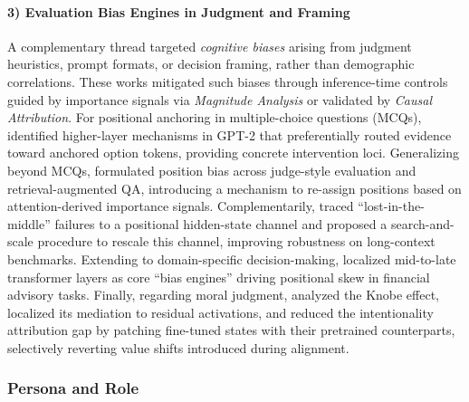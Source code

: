 \documentclass[11pt,letterpaper]{mystyle}
\begin{document}
  \paragraph{3) Evaluation Bias Engines in Judgment and Framing}
  A complementary thread targeted \emph{cognitive biases} arising from judgment heuristics, prompt formats, or decision framing, rather than demographic correlations. These works mitigated such biases through inference-time controls guided by importance signals via \textit{Magnitude Analysis} or validated by \textit{Causal Attribution}.
  For positional anchoring in multiple-choice questions (MCQs), \citet{liAnchoredAnswersUnravelling2025} identified higher-layer mechanisms in GPT-2 that preferentially routed evidence toward anchored option tokens, providing concrete intervention loci. Generalizing beyond MCQs, \citet{wangEliminatingPositionBias2025a} formulated position bias across judge-style evaluation and retrieval-augmented QA, introducing a mechanism to re-assign positions based on attention-derived importance signals. Complementarily, \citet{yuMitigatePositionBias} traced “lost-in-the-middle” failures to a positional hidden-state channel and proposed a search-and-scale procedure to rescale this channel, improving robustness on long-context benchmarks.
  Extending to domain-specific decision-making, \citet{diminoTracingPositionalBias2025} localized mid-to-late transformer layers as core “bias engines” driving positional skew in financial advisory tasks. Finally, regarding moral judgment, \citet{raimondiAnalysingMoralBias2025} analyzed the Knobe effect, localized its mediation to residual activations, and reduced the intentionality attribution gap by patching fine-tuned states with their pretrained counterparts, selectively reverting value shifts introduced during alignment.

\subsubsection{Persona and Role}
\label{sec:personalization}
\end{document}
